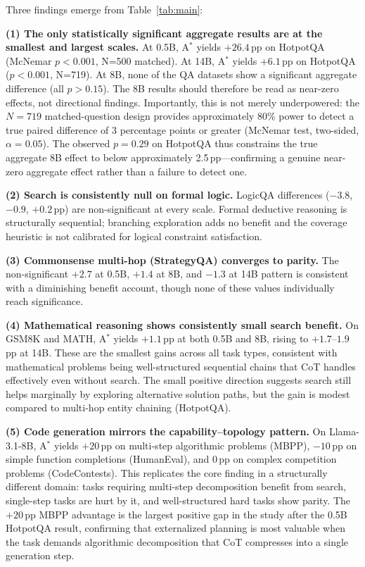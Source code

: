 \documentclass{article}
\newcommand{\astar}{A$^*$\xspace}
\begin{document}
Three findings emerge from Table~\ref{tab:main}:

\textbf{(1) The only statistically significant aggregate results are at the smallest and largest scales.}
At 0.5B, \astar yields $+26.4$\,pp on HotpotQA (McNemar $p<0.001$, N=500 matched).
At 14B, \astar yields $+6.1$\,pp on HotpotQA ($p<0.001$, N=719).
At 8B, none of the QA datasets show a significant aggregate difference (all $p>0.15$).
The 8B results should therefore be read as near-zero effects, not directional findings.
Importantly, this is not merely underpowered: the $N=719$ matched-question design provides approximately 80\% power to detect a true paired difference of 3 percentage points or greater (McNemar test, two-sided, $\alpha=0.05$). The observed $p=0.29$ on HotpotQA thus constrains the true aggregate 8B effect to below approximately 2.5\,pp---confirming a genuine near-zero aggregate effect rather than a failure to detect one.

\textbf{(2) Search is consistently null on formal logic.}
LogicQA differences ($-3.8$, $-0.9$, $+0.2$\,pp) are non-significant at every scale.
Formal deductive reasoning is structurally sequential; branching exploration adds no benefit
and the coverage heuristic is not calibrated for logical constraint satisfaction.

\textbf{(3) Commonsense multi-hop (StrategyQA) converges to parity.}
The non-significant $+2.7$ at 0.5B, $+1.4$ at 8B, and $-1.3$ at 14B pattern is consistent
with a diminishing benefit account, though none of these values individually reach significance.

\textbf{(4) Mathematical reasoning shows consistently small search benefit.}
On GSM8K and MATH, \astar yields $+1.1$\,pp at both 0.5B and 8B, rising to $+1.7$--$1.9$\,pp at 14B.
These are the smallest gains across all task types, consistent with mathematical problems being well-structured sequential chains that CoT handles effectively even without search.
The small positive direction suggests search still helps marginally by exploring alternative solution paths, but the gain is modest compared to multi-hop entity chaining (HotpotQA).

\textbf{(5) Code generation mirrors the capability--topology pattern.}
On Llama-3.1-8B, \astar yields $+20$\,pp on multi-step algorithmic problems (MBPP), $-10$\,pp on simple function completions (HumanEval), and 0\,pp on complex competition problems (CodeContests).
This replicates the core finding in a structurally different domain: tasks requiring multi-step decomposition benefit from search, single-step tasks are hurt by it, and well-structured hard tasks show parity.
The $+20$\,pp MBPP advantage is the largest positive gap in the study after the 0.5B HotpotQA result, confirming that externalized planning is most valuable when the task demands algorithmic decomposition that CoT compresses into a single generation step.
\end{document}
